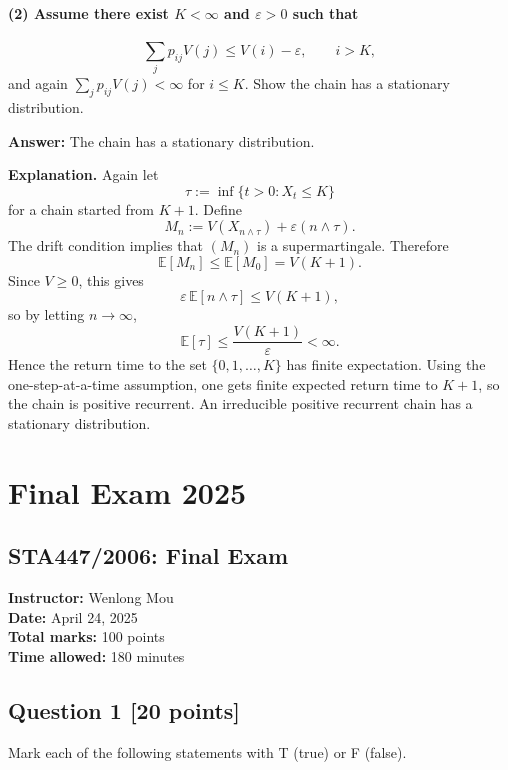 \documentclass[11pt]{article}
\theoremstyle{definition}
\begin{document}
\paragraph{(2) Assume there exist $K<\infty$ and $\varepsilon>0$ such that}
\[
\sum_j p_{ij}V(j)\le V(i)-\varepsilon, \qquad i>K,
\]
and again $\sum_j p_{ij}V(j)<\infty$ for $i\le K$. Show the chain has a stationary distribution.

\textbf{Answer:} The chain has a stationary distribution.

\textbf{Explanation.} Again let
\[
\tau:=\inf\{t>0: X_t\le K\}
\]
for a chain started from $K+1$. Define
\[
M_n:=V(X_{n\wedge\tau}) + \varepsilon (n\wedge\tau).
\]
The drift condition implies that $(M_n)$ is a supermartingale. Therefore
\[
\mathbb E[M_n]\le \mathbb E[M_0]=V(K+1).
\]
Since $V\ge 0$, this gives
\[
\varepsilon\,\mathbb E[n\wedge\tau]\le V(K+1),
\]
so by letting $n\to\infty$,
\[
\mathbb E[\tau]\le \frac{V(K+1)}{\varepsilon}<\infty.
\]
Hence the return time to the set $\{0,1,\dots,K\}$ has finite expectation. Using the one-step-at-a-time assumption, one gets finite expected return time to $K+1$, so the chain is positive recurrent. An irreducible positive recurrent chain has a stationary distribution.

\clearpage
\section{Final Exam 2025}

\subsection*{STA447/2006: Final Exam}
\textbf{Instructor:} Wenlong Mou\\
\textbf{Date:} April 24, 2025\\
\textbf{Total marks:} 100 points\\
\textbf{Time allowed:} 180 minutes

\subsection*{Question 1 \hfill [20 points]}
Mark each of the following statements with T (true) or F (false).
\end{document}
